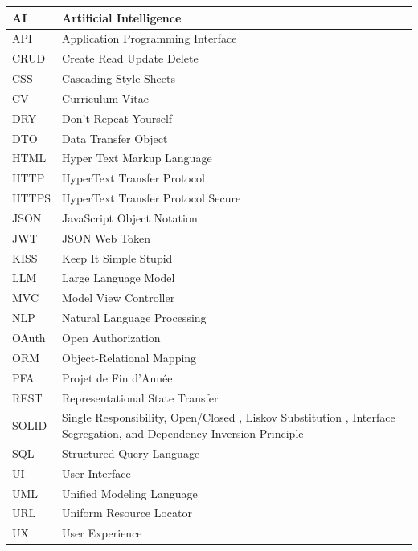 \documentclass[12pt,a4paper]{report}
\begin{document}
\begin{center}
\begin{longtable}{|l|p{11cm}|}
			AI    & Artificial Intelligence \\ \hline
			API   & Application Programming Interface \\ \hline
			CRUD  & Create Read Update Delete \\ \hline
			CSS   & Cascading Style Sheets \\ \hline
			CV    & Curriculum Vitae \\ \hline
			DRY   & Don't Repeat Yourself \\ \hline
			DTO   & Data Transfer Object \\ \hline
			HTML  & Hyper Text Markup Language \\ \hline
			HTTP  & HyperText Transfer Protocol \\ \hline
			HTTPS & HyperText Transfer Protocol Secure \\ \hline
			JSON  & JavaScript Object Notation \\ \hline
			JWT   & JSON Web Token \\ \hline
			KISS  & Keep It Simple Stupid \\ \hline
			LLM   & Large Language Model \\ \hline
			MVC   & Model View Controller \\ \hline
			NLP   & Natural Language Processing \\ \hline
			OAuth & Open Authorization \\ \hline
			ORM   & Object-Relational Mapping \\ \hline
			PFA   & Projet de Fin d'Année \\ \hline
			REST  & Representational State Transfer \\ \hline
			SOLID & Single Responsibility, Open/Closed , Liskov Substitution , Interface Segregation, and Dependency Inversion Principle \\ \hline
			SQL   & Structured Query Language \\ \hline
			UI    & User Interface \\ \hline
			UML   & Unified Modeling Language \\ \hline
			URL   & Uniform Resource Locator \\ \hline
			UX    & User Experience \\ \hline
		\end{longtable}
	\end{center}
	
	
\end{document}
